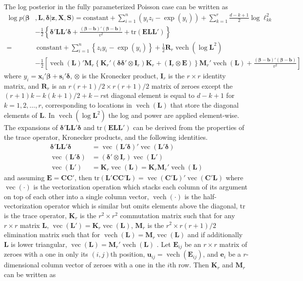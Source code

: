 \documentclass[12pt]{article}
\DeclareMathOperator{\vect}{vec}
\DeclareMathOperator{\vech}{vech}
\begin{document}
The log posterior in the fully parameterized Poisson case can be written as
\begin{align*}
\log p(\bm{\beta}&, \bm{L}, \bm{\delta}|\bm{z}, \bm{X}, \bm{S}) = \mathrm{constant}+ \sum_{i=1}^n\left(y_iz_i - \exp(y_i)\right) + \sum_{k=1}^r \frac{d - k + 1}{2}\log\ell_{kk}^2\\
& - \frac{1}{2}\left\{\bm{\delta}'\bm{L}\bm{L}'\bm{\delta}+\frac{(\bm{\beta} - \bm{b})'(\bm{\beta} - \bm{b})}{v^2} + \mathrm{tr}(\bm{E}\bm{L}\bm{L}')\right\}\\ 
=&\ \mathrm{constant} + \sum_{i=1}^n \left\{z_iy_i - \exp(y_i)\right\} + \frac{1}{2}\bm{R}_r\vech(\log\bm{L}^2)\\
&  -\frac{1}{2}\left[\vech(\bm{L})'\bm{M}_r\left\{\bm{K}_r'(\bm{\delta}\bm{\delta}'\otimes \bm{I}_r)\bm{K}_r + (\bm{I}_r\otimes \bm{E})\right\}\bm{M}_r'\vech(\bm{L})+\frac{(\bm{\beta}-\bm{b})'(\bm{\beta}-\bm{b})}{v^2}\right]
\end{align*}
where $y_i = \bm{x}_i'\bm{\beta} + \bm{s}_i'\bm{\delta}$, $\otimes$ is the Kronecker product, $\bm{I}_r$ is the $r\times r$ identity matrix, and $\bm{R}_r$ is an $r(r+1)/2\times r(r+1)/2$ matrix of zeroes except the $(r + 1)k - k(k+1)/2 + k - r$st diagonal element is equal to $d - k + 1$ for $k=1, 2, \dots, r$, corresponding to locations in $\vech(\bm{L})$ that store the diagonal elements of $\bm{L}$. In $\vech(\log\bm{L}^2)$ the log and power are applied element-wise. The expansions of $\bm{\delta}'\bm{L}\bm{L}'\bm{\delta}$ and $\mathrm{tr}(\bm{E}\bm{L}\bm{L}')$ can be derived from the properties of the trace operator, Kronecker products, and the following identities.
\begin{align*}
\bm{\delta}'\bm{L}\bm{L}'\bm{\delta}& = \vect(\bm{L}'\bm{\delta})'\vect(\bm{L}'\bm{\delta})\\ 
\vect(\bm{L}'\bm{\delta})& = (\bm{\delta}'\otimes \bm{I}_r)\vect(\bm{L}')\\
\vect(\bm{L}')& = \bm{K}_r\vect(\bm{L}) = \bm{K}_r\bm{M}_r'\vech(\bm{L})
\end{align*}
and assuming $\bm{E} = \bm{C}\bm{C}'$, then $\mathrm{tr}(\bm{L'}\bm{C}\bm{C}'\bm{L}) = \vect(\bm{C}'\bm{L})'\vect(\bm{C}'\bm{L})$
where $\vect(\cdot)$ is the vectorization operation which stacks each column of its argument on top of each other into a single column vector, $\vech(\cdot)$ is the half-vectorization operator which is similar but omits elements above the diagonal, $\mathrm{tr}$ is the trace operator, $\bm{K}_r$ is the $r^2\times r^2$ commutation matrix such that for any $r\times r$ matrix $\bm{L}$, $\vect(\bm{L}') = \bm{K}_r\vect(\bm{L})$, $\bm{M}_r$ is the $r^2\times r(r+1)/2$ elimination matrix such that for $\vech(\bm{L}) = \bm{M}_r\vect(\bm{L})$ and if additionally $\bm{L}$ is lower triangular, $\vect(\bm{L}) = \bm{M}_r'\vech(\bm{L})$ \citep{magnus1980elimination,magnus1988linear}. Let $\bm{E}_{ij}$ be an $r\times r$ matrix of zeroes with a one in only its $(i,j)$th position, $\bm{u}_{ij} = \vech(\bm{E}_{ij})$, and $\bm{e}_i$ be a $r$-dimensional column vector of zeroes with a one in the $i$th row. Then $\bm{K}_r$ and $\bm{M}_r$ can be written as
\end{document}
